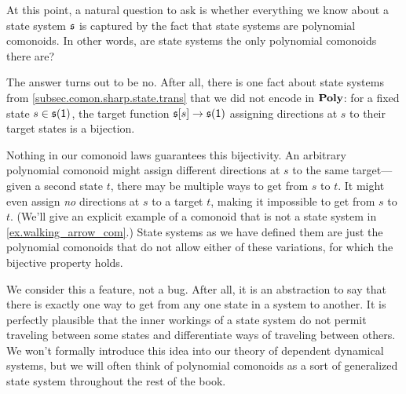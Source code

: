 \documentclass[Book-Poly]{subfiles}
\begin{document}
\begin{example} \label{ex.not_all_com_state}
At this point, a natural question to ask is whether everything we know about a state system $\mathfrak{s}$ is captured by the fact that state systems are polynomial comonoids.
In other words, are state systems the only polynomial comonoids there are?

The answer turns out to be no.
After all, there is one fact about state systems from \cref{subsec.comon.sharp.state.trans} that we did not encode in $\mathbf{Poly}$: for a fixed state $s\in\mathfrak{s}(\textsf{1})$, the target function $\mathfrak{s}[s]\to\mathfrak{s}(\textsf{1})$ assigning directions at $s$ to their target states is a bijection.

Nothing in our comonoid laws guarantees this bijectivity.
An arbitrary polynomial comonoid might assign different directions at $s$ to the same target---given a second state $t$, there may be multiple ways to get from $s$ to $t$.
It might even assign \emph{no} directions at $s$ to a target $t$, making it impossible to get from $s$ to $t$.
(We'll give an explicit example of a comonoid that is not a state system in \cref{ex.walking_arrow_com}.)
State systems as we have defined them are just the polynomial comonoids that do not allow either of these variations, for which the bijective property holds.

We consider this a feature, not a bug.
After all, it is an abstraction to say that there is exactly one way to get from any one state in a system to another.
It is perfectly plausible that the inner workings of a state system do not permit traveling between some states and differentiate ways of traveling between others.
We won't formally introduce this idea into our theory of dependent dynamical systems,
but we will often think of polynomial comonoids as a sort of generalized state system throughout the rest of the book.
\end{example}
\end{document}
